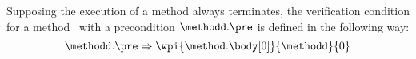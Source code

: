 \begin{itemize}
						
	 		\end{itemize}
Supposing the execution of a method always terminates, the verification condition for a method \methodd \ with a
 precondition $\methodd.\pre$ is defined in the following way:
$$ \methodd.\pre \Rightarrow \wpi{\method.\body[0]}{\methodd}{0}$$





